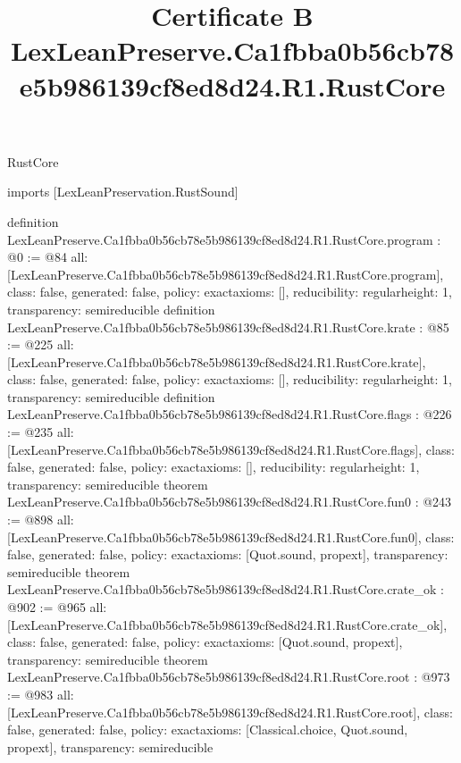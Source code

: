 \begin{lexlean}{RustCore}
\title{Certificate B LexLeanPreserve.Ca1fbba0b56cb78e5b986139cf8ed8d24.R1.RustCore}
\begin{coremodule}
imports [LexLeanPreservation.RustSound]

definition LexLeanPreserve.Ca1fbba0b56cb78e5b986139cf8ed8d24.R1.RustCore.program : @0 := @84 {
  all: [LexLeanPreserve.Ca1fbba0b56cb78e5b986139cf8ed8d24.R1.RustCore.program],
  class: false,
  generated: false,
  policy: exact{axioms: []},
  reducibility: regular{height: 1},
  transparency: semireducible
}
definition LexLeanPreserve.Ca1fbba0b56cb78e5b986139cf8ed8d24.R1.RustCore.krate : @85 := @225 {
  all: [LexLeanPreserve.Ca1fbba0b56cb78e5b986139cf8ed8d24.R1.RustCore.krate],
  class: false,
  generated: false,
  policy: exact{axioms: []},
  reducibility: regular{height: 1},
  transparency: semireducible
}
definition LexLeanPreserve.Ca1fbba0b56cb78e5b986139cf8ed8d24.R1.RustCore.flags : @226 := @235 {
  all: [LexLeanPreserve.Ca1fbba0b56cb78e5b986139cf8ed8d24.R1.RustCore.flags],
  class: false,
  generated: false,
  policy: exact{axioms: []},
  reducibility: regular{height: 1},
  transparency: semireducible
}
theorem LexLeanPreserve.Ca1fbba0b56cb78e5b986139cf8ed8d24.R1.RustCore.fun0 : @243 := @898 {
  all: [LexLeanPreserve.Ca1fbba0b56cb78e5b986139cf8ed8d24.R1.RustCore.fun0],
  class: false,
  generated: false,
  policy: exact{axioms: [Quot.sound, propext]},
  transparency: semireducible
}
theorem LexLeanPreserve.Ca1fbba0b56cb78e5b986139cf8ed8d24.R1.RustCore.crate_ok : @902 := @965 {
  all: [LexLeanPreserve.Ca1fbba0b56cb78e5b986139cf8ed8d24.R1.RustCore.crate_ok],
  class: false,
  generated: false,
  policy: exact{axioms: [Quot.sound, propext]},
  transparency: semireducible
}
theorem LexLeanPreserve.Ca1fbba0b56cb78e5b986139cf8ed8d24.R1.RustCore.root : @973 := @983 {
  all: [LexLeanPreserve.Ca1fbba0b56cb78e5b986139cf8ed8d24.R1.RustCore.root],
  class: false,
  generated: false,
  policy: exact{axioms: [Classical.choice, Quot.sound, propext]},
  transparency: semireducible
}


\end{coremodule}
\end{lexlean}
